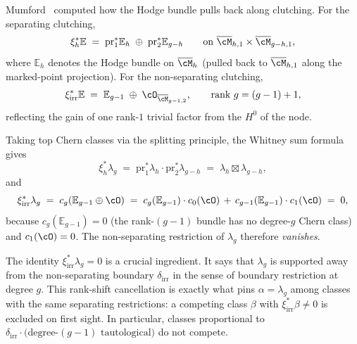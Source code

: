 \begin{lemma}
\label{lem:mumford-hodge-clutching-top-chern}
Mumford~\cite{Mumford83} computed how the Hodge bundle pulls back along
clutching. For the separating clutching,
\begin{equation}\label{eq:hodge-separating}
\xi_h^* \mathbb{E}
\;=\;
\mathrm{pr}_1^* \mathbb{E}_h \;\oplus\;
\mathrm{pr}_2^* \mathbb{E}_{g-h}
\qquad \text{on } \overline{\cM}_{h,1}\times\overline{\cM}_{g-h,1},
\end{equation}
where $\mathbb{E}_h$ denotes the Hodge bundle on $\overline{\cM}_h$
(pulled back to $\overline{\cM}_{h,1}$ along the marked-point
projection). For the non-separating clutching,
\begin{equation}\label{eq:hodge-nonseparating}
\xi_{\mathrm{irr}}^* \mathbb{E}
\;=\;
\mathbb{E}_{g-1} \;\oplus\; \cO_{\overline{\cM}_{g-1,2}},
\qquad \text{rank } g = (g-1) + 1,
\end{equation}
reflecting the gain of one rank-$1$ trivial factor from the
$H^0$ of the node.

Taking top Chern classes via the splitting principle, the Whitney sum
formula gives
\begin{equation}\label{eq:clutching-lambda-g-separating}
\xi_h^* \lambda_g
\;=\;
\mathrm{pr}_1^* \lambda_h \cdot \mathrm{pr}_2^* \lambda_{g-h}
\;=\;
\lambda_h \boxtimes \lambda_{g-h},
\end{equation}
and
\begin{equation}\label{eq:clutching-lambda-g-nonseparating}
\xi_{\mathrm{irr}}^* \lambda_g
\;=\;
c_g(\mathbb{E}_{g-1} \oplus \cO)
\;=\;
c_g(\mathbb{E}_{g-1}) \cdot c_0(\cO) \,+\, c_{g-1}(\mathbb{E}_{g-1})\cdot c_1(\cO)
\;=\;
0,
\end{equation}
because $c_g(\mathbb{E}_{g-1}) = 0$ (the rank-$(g-1)$ bundle has no
degree-$g$ Chern class) and $c_1(\cO) = 0$. The non-separating
restriction of $\lambda_g$ therefore \emph{vanishes}.
\end{lemma}

\begin{remark}
\label{rem:nonseparating-vanishing}
The identity $\xi_{\mathrm{irr}}^* \lambda_g = 0$ is a crucial
ingredient. It says that $\lambda_g$ is supported away from the
non-separating boundary $\delta_{\mathrm{irr}}$ in the sense of
boundary restriction at degree $g$. This rank-shift cancellation is
exactly what pins $\alpha = \lambda_g$ among classes with the
same separating restrictions: a competing class $\beta$ with
$\xi_{\mathrm{irr}}^*\beta \neq 0$ is excluded on first sight. In
particular, classes proportional to $\delta_{\mathrm{irr}} \cdot
\text{(degree-}(g{-}1)\text{ tautological)}$ do not compete.
\end{remark}

